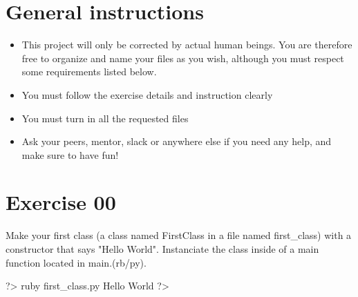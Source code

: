 \documentclass{42-en}
\begin{document}
\chapter{General instructions}

	\begin{itemize}
		\item This project will only be corrected by actual human beings.
		You are therefore free to organize and name your files as you wish,
		although you must respect some requirements listed below.
		\item You must follow the exercise details and instruction clearly
		\item You must turn in all the requested files
		\item Ask your peers, mentor, slack or anywhere else if you need
		any help, and make sure to have fun!
	\end{itemize}

\startexercices

\chapter{Exercise 00}


\makeheaderfiles

Make your first class (a class named FirstClass in a file named first\_class) with a constructor that says "Hello World". Instanciate the class inside of a main function located in main.(rb/py).

\begin{42console}
	?> ruby first_class.py
	Hello World
	?>
\end{42console}
\end{document}
